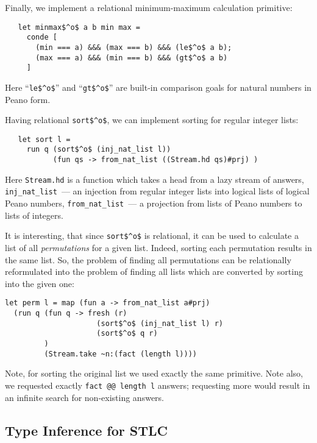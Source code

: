 Finally, we implement a relational minimum-maximum calculation
primitive:

\begin{lstlisting}
   let minmax$^o$ a b min max =
     conde [
       (min === a) &&& (max === b) &&& (le$^o$ a b);
       (max === a) &&& (min === b) &&& (gt$^o$ a b)
     ]
\end{lstlisting}

Here ``\lstinline|le$^o$|'' and ``\lstinline|gt$^o$|'' are built-in comparison goals for natural numbers in Peano form.

Having relational \lstinline|sort$^o$|, we can implement sorting for regular integer lists:

\begin{lstlisting}
   let sort l =
     run q (sort$^o$ (inj_nat_list l))
           (fun qs -> from_nat_list ((Stream.hd qs)#prj) )
\end{lstlisting}

Here \lstinline|Stream.hd| is a function which takes a head from a lazy stream of answers,
\lstinline|inj_nat_list|~--- an injection from regular integer lists into logical lists of logical Peano numbers,
\lstinline|from_nat_list|~--- a projection from lists of Peano numbers to lists of integers.

It is interesting, that since \lstinline|sort$^o$| is
relational, it can be used to calculate a list of all \emph{permutations}
for a given list. Indeed, sorting each permutation results in the same list.
So, the problem of finding all permutations can be relationally reformulated into
the problem of finding all lists which are converted by sorting into the given one:

\begin{lstlisting}
let perm l = map (fun a -> from_nat_list a#prj)
  (run q (fun q -> fresh (r)
                     (sort$^o$ (inj_nat_list l) r)
                     (sort$^o$ q r)
         )
         (Stream.take ~n:(fact (length l))))
\end{lstlisting}

Note, for sorting the original list we used exactly the same primitive. Note also,
we requested exactly \lstinline|fact @@ length l| answers; requesting more
would result in an infinite search for non-existing answers.

\subsection{Type Inference for STLC}

